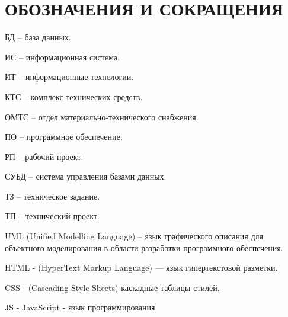 \section*{ОБОЗНАЧЕНИЯ И СОКРАЩЕНИЯ}

БД -- база данных.

ИС -- информационная система.

ИТ -- информационные технологии. 

КТС -- комплекс технических средств.

ОМТС -- отдел материально-технического снабжения. 

ПО -- программное обеспечение.

РП -- рабочий проект.

СУБД -- система управления базами данных.

ТЗ -- техническое задание.

ТП -- технический проект.


UML (Unified Modelling Language) -- язык графического описания для объектного моделирования в области разработки программного обеспечения.

HTML - (HyperText Markup Language) — язык гипертекстовой разметки.

CSS - (Cascading Style Sheets) каскадные таблицы стилей.

JS - JavaScript - язык программирования
